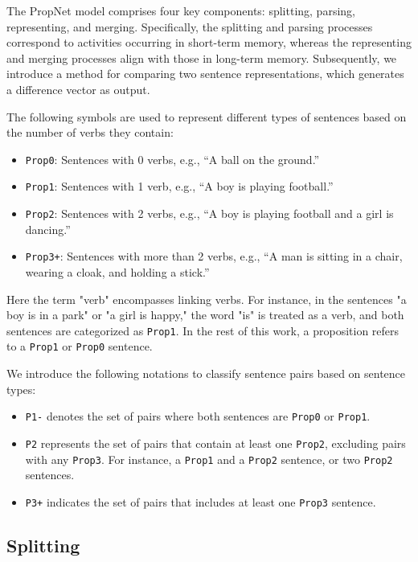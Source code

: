 The PropNet model comprises four key components: splitting, parsing, representing, and merging. Specifically, the splitting and parsing processes  correspond to activities occurring in short-term memory, whereas the representing and merging processes align with those in long-term memory. Subsequently, we introduce a method for comparing two sentence representations, which generates a difference vector as output.

The following symbols are used to represent different types of sentences based on the number of verbs they contain:

\begin{itemize}
    \item \texttt{Prop0}: Sentences with 0 verbs, e.g., ``A ball on the ground.''
    \item \texttt{Prop1}: Sentences with 1 verb, e.g., ``A boy is playing football.''
    \item \texttt{Prop2}: Sentences with 2 verbs, e.g., ``A boy is playing football and a girl is dancing.''
    \item \texttt{Prop3+}: Sentences with more than 2 verbs, e.g., ``A man is sitting in a chair, wearing a cloak, and holding a stick.''
\end{itemize}

Here the term "verb" encompasses linking verbs. For instance, in the sentences "a boy is in a park" or "a girl is happy," the word "is" is treated as a verb, and both sentences are categorized as \texttt{Prop1}. In the rest of this work, a proposition refers to a \texttt{Prop1} or \texttt{Prop0} sentence.


We introduce the following notations to classify sentence pairs based on sentence types:

\begin{itemize}
    \item \texttt{P1-} denotes the set of pairs where both sentences are \texttt{Prop0} or \texttt{Prop1}.
    \item \texttt{P2} represents the set of pairs that contain at least one \texttt{Prop2}, excluding pairs with any \texttt{Prop3}. For instance, a \texttt{Prop1} and a \texttt{Prop2} sentence, or two \texttt{Prop2} sentences. 
    \item \texttt{P3+} indicates the set of pairs that includes at least one \texttt{Prop3} sentence.
\end{itemize}

\subsection{Splitting}

